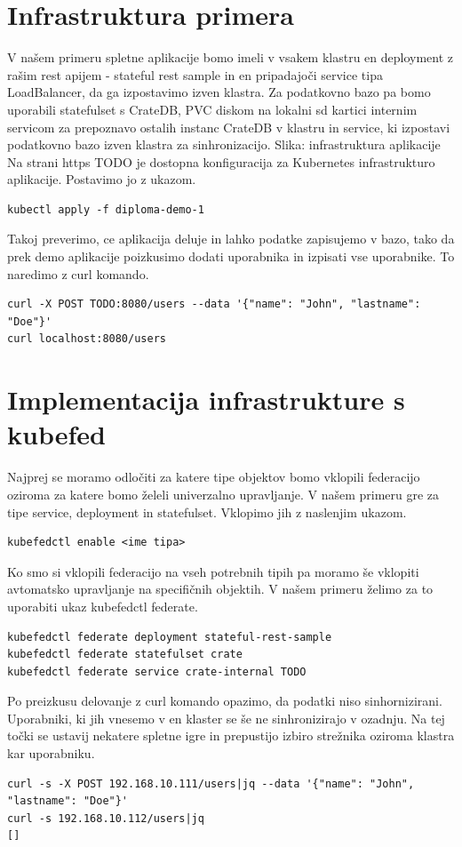\documentclass[a4paper, 12pt]{book}
\begin{document}
\section{Infrastruktura primera}
V našem primeru spletne aplikacije bomo imeli v vsakem klastru en deployment z rašim rest apijem - stateful rest sample in en pripadajoči service tipa LoadBalancer, da ga izpostavimo izven klastra.
Za podatkovno bazo pa bomo uporabili statefulset s CrateDB, PVC diskom na lokalni sd kartici internim servicom za prepoznavo ostalih instanc CrateDB v klastru in service, ki izpostavi podatkovno bazo izven klastra za sinhronizacijo.
Slika: infrastruktura aplikacije
Na strani https TODO je dostopna konfiguracija za Kubernetes infrastrukturo aplikacije. Postavimo jo z ukazom.
\begin{verbatim}
kubectl apply -f diploma-demo-1
\end{verbatim}
Takoj preverimo, ce aplikacija deluje in lahko podatke zapisujemo v bazo, tako da prek demo aplikacije poizkusimo dodati uporabnika in izpisati vse uporabnike. To naredimo z curl komando.
\begin{verbatim}
curl -X POST TODO:8080/users --data '{"name": "John", "lastname": "Doe"}'
curl localhost:8080/users
\end{verbatim}
\section{Implementacija infrastrukture s kubefed}
Najprej se moramo odločiti za katere tipe objektov bomo vklopili federacijo oziroma za katere bomo želeli univerzalno upravljanje. V našem primeru gre za tipe service, deployment in statefulset. Vklopimo jih z naslenjim ukazom.
\begin{verbatim}
kubefedctl enable <ime tipa>
\end{verbatim}
Ko smo si vklopili federacijo na vseh potrebnih tipih pa moramo še vklopiti avtomatsko upravljanje na specifičnih objektih. V našem primeru želimo za to uporabiti ukaz kubefedctl federate.
\begin{verbatim}
kubefedctl federate deployment stateful-rest-sample
kubefedctl federate statefulset crate
kubefedctl federate service crate-internal TODO
\end{verbatim}
Po preizkusu delovanje z curl komando opazimo, da podatki niso sinhornizirani. Uporabniki, ki jih vnesemo v en klaster se še ne sinhronizirajo v ozadnju.
Na tej točki se ustavij nekatere spletne igre in prepustijo izbiro strežnika oziroma klastra kar uporabniku.
\begin{verbatim}
curl -s -X POST 192.168.10.111/users|jq --data '{"name": "John", "lastname": "Doe"}'
curl -s 192.168.10.112/users|jq
[]
\end{verbatim}
\end{document}
